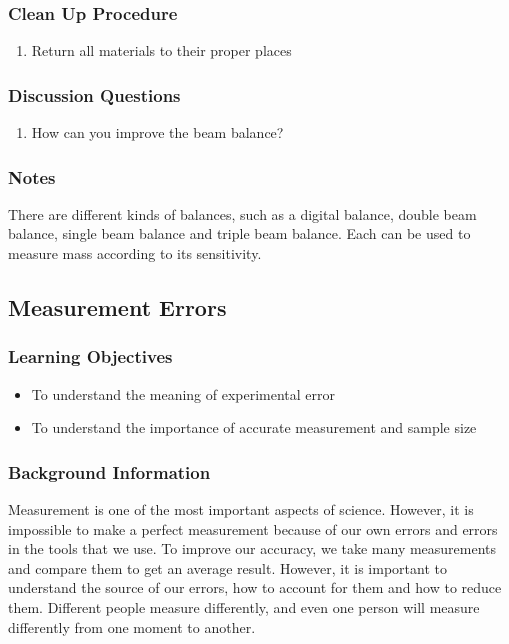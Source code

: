 \subsubsection*{Clean Up Procedure}
\begin{enumerate}
\item{Return all materials to their proper places}
\end{enumerate}

\subsubsection*{Discussion Questions}
\begin{enumerate}
\item{How can you improve the beam balance?}
\end{enumerate}

\subsubsection*{Notes}
There are different kinds of balances, such as a digital balance, double beam balance, single beam balance and triple beam balance. Each can be used to measure mass according to its sensitivity.

\subsection{Measurement Errors}

\subsubsection*{Learning Objectives}
\begin{itemize}
\item{To understand the meaning of experimental error}
\item{To understand the importance of accurate measurement and sample size}
\end{itemize}

\subsubsection*{Background Information}
Measurement is one of the most important aspects of science. However, it is impossible to make a perfect measurement because of our own errors and errors in the tools that we use. To improve our accuracy, we take many measurements and compare them to get an average result. However, it is important to understand the source of our errors, how to account for them and how to reduce them. Different people measure differently, and even one person will measure differently from one moment to another.

